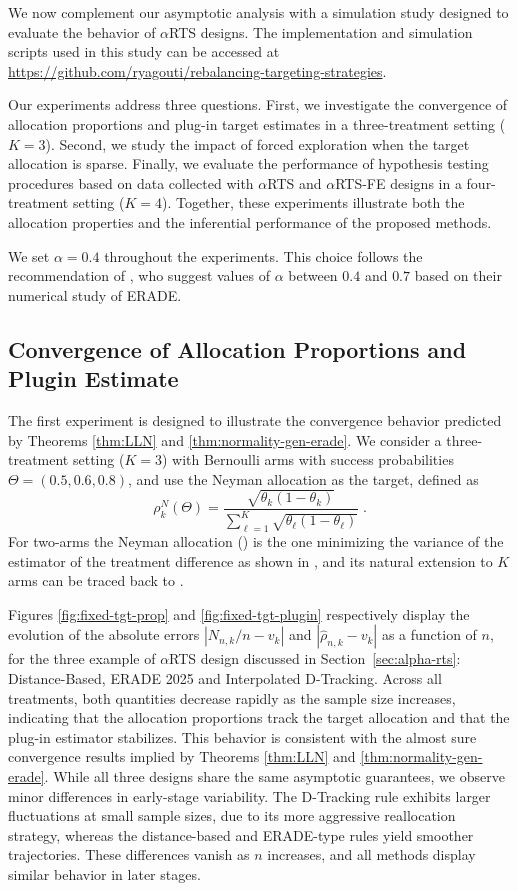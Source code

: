 
We now complement our asymptotic analysis with a simulation study designed to evaluate the behavior of $\alpha$RTS designs. The implementation and simulation scripts used in this study can be accessed at \url{https://github.com/ryagouti/rebalancing-targeting-strategies}.

	Our experiments address three questions. First, we investigate the
	convergence of allocation proportions and plug-in target estimates in a
	three-treatment setting (\(K=3\)). Second, we study the impact of forced
	exploration when the target allocation is sparse. Finally, we evaluate the
	performance of hypothesis testing procedures based on data collected with
	\(\alpha\)RTS and \(\alpha\)RTS-FE designs in a four-treatment setting
	(\(K=4\)). Together, these experiments illustrate both the allocation
	properties and the inferential performance of the proposed methods.
	
	We set \(\alpha=0.4\) throughout the experiments. This choice follows the recommendation of \cite{hu2009efficient}, who suggest values of \(\alpha\) between \(0.4\) and \(0.7\)
	based on their numerical study of ERADE.

\subsection{Convergence of Allocation Proportions and Plugin Estimate}

The first experiment is designed to illustrate the convergence behavior predicted by Theorems \ref{thm:LLN} and \ref{thm:normality-gen-erade}. We consider a three-treatment setting (\(K=3\)) with Bernoulli arms with success probabilities $\Theta=(0.5, 0.6, 0.8)$, and use the Neyman allocation as the target, defined as
\[\rho_k^N(\Theta) = \frac{\sqrt{\theta_k(1-\theta_k)}}{\sum_{\ell=1}^{K}\sqrt{\theta_{\ell}(1-\theta_{\ell})}}\;.\]
For two-arms the Neyman allocation (\cite{neyman1934representative}) is the one minimizing the variance of the estimator of the treatment difference as shown in \cite{melfi1998variablility}, and its natural extension to $K$ arms can be traced back to \cite{Cochran1977}.

Figures \ref{fig:fixed-tgt-prop} and \ref{fig:fixed-tgt-plugin} respectively  display  the evolution of the absolute errors $|N_{n,k}/n - v_k|$ and $|\hat{\rho}_{n,k} - v_k|$ as a function of $n$, for the three example of $\alpha$RTS design discussed in Section~\ref{sec:alpha-rts}: Distance-Based, ERADE 2025 and Interpolated D-Tracking. Across all treatments, both quantities decrease rapidly as the sample size increases, indicating that the allocation proportions track the target allocation and that the plug-in estimator stabilizes. This behavior is consistent with the almost sure convergence results  implied by Theorems \ref{thm:LLN} and \ref{thm:normality-gen-erade}. While all three designs share the same asymptotic guarantees, we observe minor differences in early-stage variability. The D-Tracking rule exhibits larger fluctuations at small sample sizes, due to its more aggressive reallocation strategy, whereas the distance-based and ERADE-type rules yield smoother trajectories. These differences vanish as $n$ increases, and all methods display similar behavior in later stages.

